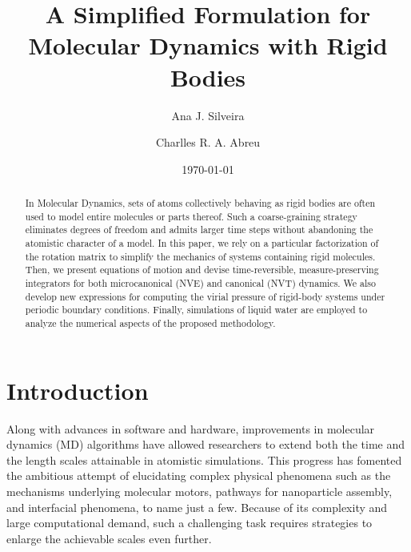 \documentclass[aip,jcp,reprint,amsmath,amssymb]{revtex4-1}
\begin{document}
\title{A Simplified Formulation for Molecular Dynamics with Rigid Bodies}

\author{Ana J. Silveira}

\author{Charlles R. A. Abreu}

\date{\today}

\begin{abstract}
In Molecular Dynamics, sets of atoms collectively behaving as rigid bodies are often used to model entire molecules or parts thereof. Such a coarse-graining strategy eliminates degrees of freedom and admits larger time steps without abandoning the atomistic character of a model. In this paper, we rely on a particular factorization of the rotation matrix to simplify the mechanics of systems containing rigid molecules. Then, we present equations of motion and devise time-reversible, measure-preserving integrators for both microcanonical (NVE) and canonical (NVT) dynamics. We also develop new expressions for computing the virial pressure of rigid-body systems under periodic boundary conditions. Finally, simulations of liquid water are employed to analyze the numerical aspects of the proposed methodology.
\end{abstract}

\maketitle

\section{Introduction}

Along with advances in software and hardware, improvements in molecular dynamics (MD) algorithms have allowed researchers to extend both the time and the length scales attainable in atomistic simulations. This progress has fomented the ambitious attempt of elucidating complex physical phenomena such as the mechanisms underlying molecular motors, pathways for nanoparticle assembly, and interfacial phenomena, to name just a few. Because of its complexity and large computational demand, such a challenging task requires strategies to enlarge the achievable scales even further.
\end{document}
